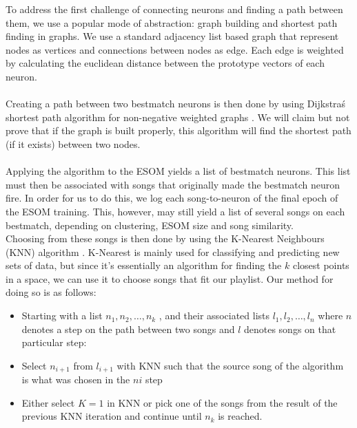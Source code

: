 To address the first challenge of connecting neurons and finding a path between them, we use a popular mode of abstraction: graph building and shortest path finding in graphs. We use a standard adjacency list based graph \citep{algs4} that represent nodes as vertices and connections between nodes as edge. Each edge is weighted by calculating the euclidean distance between the prototype vectors of each neuron. \\\\
Creating a path between two bestmatch neurons is then done by using Dijkstra\'s shortest path algorithm for non-negative weighted graphs \citep{algs4}. We will claim but not prove that if the graph is built properly, this algorithm will find the shortest path (if it exists) between two nodes. 
\\\\
Applying the algorithm to the ESOM yields a list of bestmatch neurons. This list must then be associated with songs that originally made the bestmatch neuron fire. In order for us to do this, we log each song-to-neuron of the final epoch of the ESOM training. This, however, may still yield a list of several songs on each bestmatch, depending on clustering, ESOM size and song similarity. \\
Choosing from these songs is then done by using the K-Nearest Neighbours (KNN) algorithm \citep{han12}. K-Nearest is mainly used for classifying and predicting new sets of data, but since it's essentially an algorithm for finding the $k$ closest points in a space, we can use it to choose songs that fit our playlist. Our method for doing so is as follows:

\begin{itemize}
\item Starting with a list $ n_1, n_2, \dots, n_k $ , and their associated lists $ l_1, l_2, \dots, l_n $ where $n$ denotes a step on the path between two songs and $l$ denotes songs on that particular step: \\
\item Select $ n_{i+1} $ from $ l_{i+1} $ with KNN such that the source song of the algorithm is what was chosen in the $ n{i} $ step \\
\item Either select $K = 1$ in KNN or pick one of the songs from the result of the previous KNN iteration and continue until $n_k$ is reached.\\
\end{itemize}

